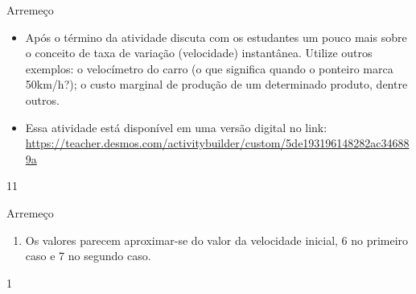 \begin{sugestions}{Arremeço}
{\begin{itemize}
\begin{figure}[H]
\begin{tikzpicture}[xscale=2.8,scale=.9]
  \end{tikzpicture}
\end{figure}

\item Após o término da atividade discuta com os estudantes um pouco mais sobre o conceito de taxa de variação (velocidade) instantânea. Utilize outros exemplos: o velocímetro do carro (o que significa quando o ponteiro marca 50km/h?); o custo marginal de produção de um determinado produto, dentre outros.

\item Essa atividade está disponível em uma versão digital no link: \url{https://teacher.desmos.com/activitybuilder/custom/5de193196148282ac346889a}

\end{itemize}
}{1}{1}
\end{sugestions}
\begin{answer}{Arremeço}
{
\centering
{}
\begin{enumerate}

\item Os valores parecem aproximar-se do valor da velocidade inicial, 6 no primeiro caso e 7 no segundo caso.

\end{enumerate}
}{1}
\end{answer}
\clearmargin
